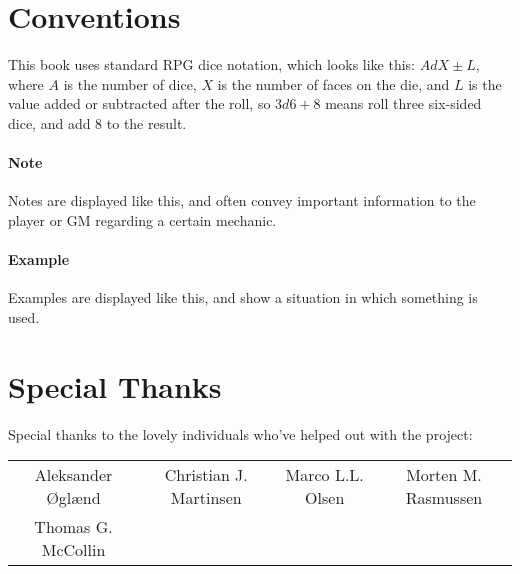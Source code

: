 \documentclass[a4paper]{book}
\begin{document}
\section*{Conventions}
This book uses standard RPG dice notation, which looks like this: $AdX\pm L$, where $A$ is the number of dice, $X$ is the number of faces on the die, and $L$ is the value added or subtracted after the roll, so $3d6+8$ means roll three six-sided dice, and add 8 to the result.
\paragraph{Note} Notes are displayed like this, and often convey important information to the player or GM regarding a certain mechanic.
\paragraph{Example} Examples are displayed like this, and show a situation in which something is used.

\newpage
\section*{Special Thanks}
Special thanks to the lovely individuals who've helped out with the project:
\begin{center}
    \begin{tabular}{cccc}
        Aleksander Øglænd & Christian J. Martinsen & Marco L.L. Olsen & Morten M. Rasmussen \\
        Thomas G. McCollin \\
    \end{tabular}
\end{center}

\tableofcontents












\end{document}

